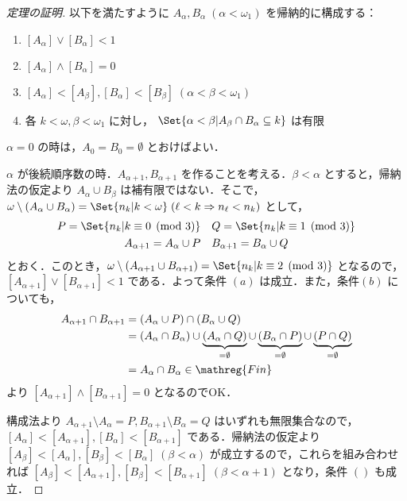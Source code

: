 \documentclass[a4j,xelatex,ja=standard]{bxjsarticle}
\newcommand{\Fin}{\mathreg{Fin}}
\begin{document}
\begin{proof}[定理の証明]
 以下を満たすように $A_\alpha, B_\alpha \; (\alpha < \omega_1)$ を帰納的に構成する：
 \begin{enumerate}[label=(\alph*)]
  \item $[A_\alpha] \vee [B_\alpha] < 1$
  \item $[A_\alpha] \wedge [B_\alpha] = 0$
  \item $[A_\alpha] < [A_\beta], [B_\alpha] < [B_\beta]\;(\alpha < \beta < \omega_1)$
  \item 各 $k < \omega, \beta < \omega_1$ に対し，
	$\Set{\alpha < \beta | A_\beta \cap B_\alpha \subseteq k}$ は有限
 \end{enumerate}

 $\alpha = 0$ の時は，$A_0 = B_0 = \emptyset$ とおけばよい．

 $\alpha$ が後続順序数の時．$A_{\alpha + 1}, B_{\alpha + 1}$ を作ることを考える．$\beta < \alpha$ とすると，帰納法の仮定より $A_\alpha \cup B_\beta$ は補有限ではない．そこで，$\omega \setminus (A_\alpha \cup B_\alpha) = \Set{ n_k | k < \omega } \; (\ell < k \Rightarrow n_\ell < n_k)$ として，
 \begin{gather*}
  P = \Set{n_k | k \equiv 0 \pmod{3}} \quad Q = \Set{n_k | k \equiv 1 \pmod{3}}\\
  A_{\alpha + 1} = A_\alpha \cup P \quad B_{\alpha + 1} = B_\alpha \cup Q
 \end{gather*}
  とおく．このとき，$\omega \setminus (A_{\alpha + 1} \cup B_{\alpha + 1}) = \Set{n_k | k \equiv 2 \pmod{3}}$ となるので，$[A_{\alpha + 1}] \vee [B_{\alpha+1}] < 1$ である．よって条件 $(a)$ は成立．また，条件$(b)$ についても，
 \begin{align*}
  A_{\alpha + 1} \cap B_{\alpha+1} &= (A_\alpha \cup P) \cap (B_\alpha \cup Q)\\
  &= (A_\alpha \cap B_\alpha) \cup \underbrace{ (A_\alpha \cap Q)}_{=\emptyset} \cup \underbrace{(B_\alpha \cap P)}_{=\emptyset} \cup \underbrace{(P \cap Q)}_{=\emptyset}\\
  &= A_\alpha \cap B_\alpha \in \Fin
 \end{align*}
 より $[A_{\alpha+1}] \wedge [B_{\alpha+1}] = 0$ となるのでOK．

 構成法より $A_{\alpha+1} \setminus A_{\alpha} = P,  B_{\alpha+1} \setminus B_\alpha = Q$ はいずれも無限集合なので，$[A_\alpha] < [A_{\alpha+1}], [B_\alpha] < [B_{\alpha+1}]$ である．帰納法の仮定より $[A_\beta] < [A_\alpha], [B_\beta] < [B_\alpha] \; (\beta < \alpha)$ が成立するので，これらを組み合わせれば $[A_\beta] < [A_{\alpha+1}], [B_\beta] < [B_{\alpha+1}] \; (\beta < \alpha+1)$ となり，条件 $()$ も成立．


\end{proof}
\end{document}
